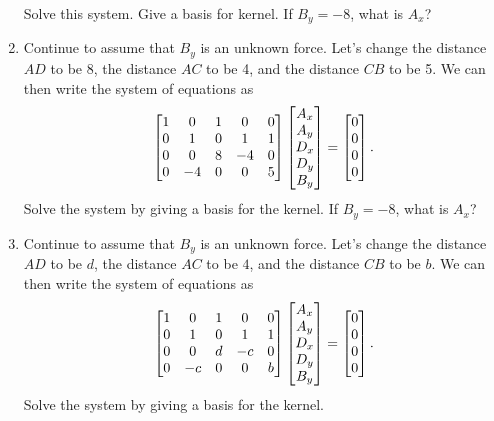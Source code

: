 \begin{problem}[Statics]
\begin{enumerate}
Solve this system. Give a basis for kernel. If $B_y=-8$, what is $A_x$? 
 \item Continue to assume that $B_y$ is an unknown force. Let's change the distance $AD$ to be 8, the distance $AC$ to be 4, and the distance $CB$ to be 5. We can then write the system of equations as 
$$\begin{bmatrix} 
1&0&1&0&0\\
0&1&0&1&1\\
0&0&8&-4&0\\
0&-4&0&0&5
 \end{bmatrix}
\begin{bmatrix} A_x\\A_y\\D_x\\D_y\\B_y \end{bmatrix}
=\begin{bmatrix} 0\\0\\0\\0 \end{bmatrix}.$$
Solve the system by giving a basis for the kernel. If $B_y=-8$, what is $A_x$?
 \item Continue to assume that $B_y$ is an unknown force. Let's change the distance $AD$ to be $d$, the distance $AC$ to be $4$, and the distance $CB$ to be $b$. We can then write the system of equations as 
$$\begin{bmatrix} 
1&0&1&0&0\\
0&1&0&1&1\\
0&0&d&-c&0\\
0&-c&0&0&b
 \end{bmatrix}
\begin{bmatrix} A_x\\A_y\\D_x\\D_y\\B_y \end{bmatrix}
=\begin{bmatrix} 0\\0\\0\\0 \end{bmatrix}.$$
Solve the system by giving a basis for the kernel. 
\end{enumerate}
\end{problem}





